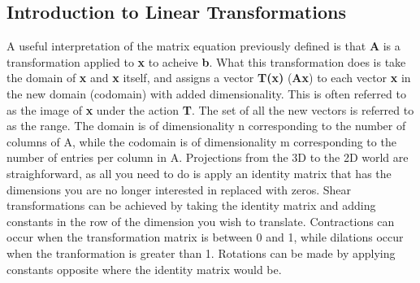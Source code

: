 \documentclass[12pt]{article}
\begin{document}
\subsection{Introduction to Linear Transformations}
A useful interpretation of the matrix equation previously defined is that \textbf{A} is a transformation applied to \textbf{x} to acheive \textbf{b}. What this transformation %
does is take the domain of \textbf{x} and \textbf{x} itself, and assigns a vector \textbf{T(x)} (\textbf{Ax}) to each vector \textbf{x} in the new domain (codomain) %
with added dimensionality.%
This is often referred to as the image of \textbf{x} under the action \textbf{T}. The set of all the new vectors is referred to as the range. The domain is of dimensionality n %
corresponding to the number of columns of A, while the codomain is of dimensionality m corresponding to the number of entries per column in A. 
\newline
\newline
Projections from the 3D to the 2D world are straighforward, as all you need to do is apply an identity matrix that has the dimensions you are no longer interested in replaced %
with zeros. Shear transformations can be achieved by taking the identity matrix and adding constants in the row of the dimension you wish to translate. Contractions can occur %
when the transformation matrix is between 0 and 1, while dilations occur when the tranformation is greater than 1. Rotations can be made by applying constants opposite %
where the identity matrix would be. 
\newline
\end{document}
